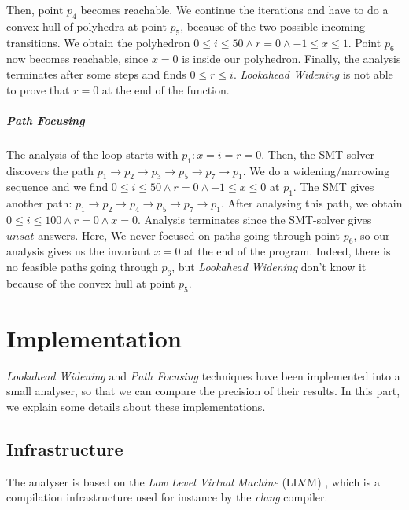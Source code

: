 \documentclass[a4paper,english,titlepage,11pt]{report}
\begin{document}
Then, point $p_4$ becomes reachable. We continue the iterations and have to do
a convex hull of polyhedra at point $p_5$, because of the two possible incoming
transitions.
We obtain the polyhedron
$ 0 \leq i \leq 50 \wedge r=0 \wedge -1 \leq x \leq 1$.
Point $p_6$ now becomes reachable, since $x=0$ is inside our polyhedron.
Finally, the analysis terminates after some steps and finds $0 \leq r \leq i$.
\emph{Lookahead Widening} is not able to prove that $r = 0$ at the end of the
function.

\paragraph{Path Focusing} 
The analysis of the loop starts with 
$p_1: x=i=r=0$. Then, the SMT-solver discovers the path $p_1 \rightarrow p_2
\rightarrow p_3 \rightarrow p_5 \rightarrow p_7 \rightarrow p_1$. We do a
widening/narrowing sequence and we find 
$ 0 \leq i \leq 50 \wedge r=0 \wedge -1 \leq x \leq 0$ at $p_1$. The SMT gives
another path: 
$p_1 \rightarrow p_2
\rightarrow p_4 \rightarrow p_5 \rightarrow p_7 \rightarrow p_1$. After
analysing this path, we obtain 
$ 0 \leq i \leq 100 \wedge r=0 \wedge x=0$. Analysis terminates since the
SMT-solver gives $unsat$ answers. Here, We never focused on paths going through
point $p_6$, so our analysis gives us the invariant $x=0$ at the end of the
program. Indeed, there is no feasible paths going through $p_6$, but
\emph{Lookahead Widening} don't know it because of the convex hull at point
$p_5$.





\FloatBarrier
\chapter{Implementation}\label{implementationpart}

\emph{Lookahead Widening} and \emph{Path Focusing}
techniques have been implemented into a small analyser, so that we can compare
the precision of their results. In this part, we explain some details about
these implementations.

 \section{Infrastructure}
The analyser is based on the \emph{Low Level Virtual Machine} (LLVM)
\cite{LLVM:CGO04}, which is a compilation infrastructure used for instance by
the \emph{clang} compiler.
\end{document}
